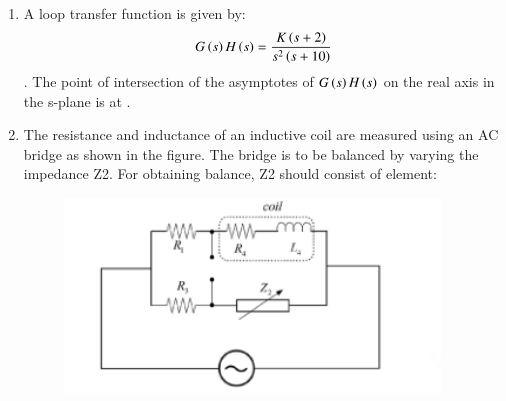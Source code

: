 \documentclass[journal,12pt,onecolumn]{IEEEtran}
\theoremstyle{remark}
\begin{document}
\begin{enumerate}
    \hfill{}
        \begin{enumerate}
        \end{enumerate}
    
    \item A loop transfer function is given by: $$G\left(s\right)H\left(s\right) = \frac{K\left(s+2\right)}{s^2\left(s+10\right)}$$. The point of intersection of the asymptotes of $G\left(s\right)H\left(s\right)$ on the real axis in the s-plane is at \underline{\hspace{2cm}}.

    \hfill{}
    
    \item The resistance and inductance of an inductive coil are measured using an AC bridge as shown in the figure. The bridge is to be balanced by varying the impedance Z2. For obtaining balance, Z2 should consist of element:
    \begin{figure}[H]
        \centering
        \includegraphics[width=0.6\columnwidth]{q22}
        \caption*{}
        \label{Q22}
    \end{figure}

    \hfill{}
        \begin{enumerate}
        \end{enumerate}
    

\end{enumerate}
\end{document}
